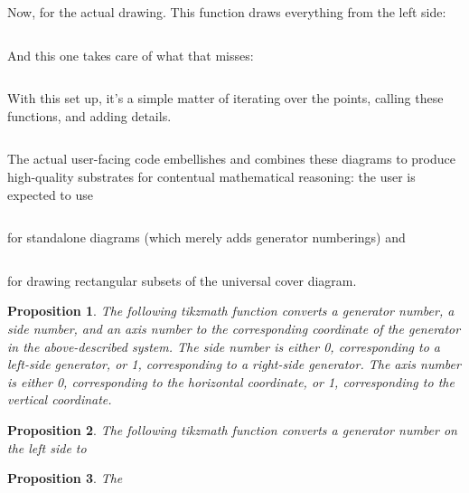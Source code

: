 \documentclass{article}
\newtheorem{prop}{Proposition}
\begin{document}
Now, for the actual drawing.
This function draws everything from the left side:
\inputminted[firstline=75, lastline=103]{tex}{../draw/draw.tex}

And this one takes care of what that misses:
\inputminted[firstline=104, lastline=140]{tex}{../draw/draw.tex}

With this set up, it's a simple matter of iterating over the points, calling these functions,
and adding details.
\inputminted[firstline=141, lastline=149]{tex}{../draw/draw.tex}

The actual user-facing code embellishes and combines these diagrams to produce high-quality substrates
for contentual mathematical reasoning: the user is expected to use
\inputminted[firstline=153, lastline=160]{text}{../draw/draw.tex}
for standalone diagrams (which merely adds generator numberings) and
\inputminted[firstline=162, lastline=180]{tex}{../draw/draw.tex}
for drawing rectangular subsets of the universal cover diagram.


\begin{prop}
  The following tikzmath function converts a generator number, a side number, and an axis number
  to the corresponding coordinate of the generator in the above-described system.
  The side number is either 0, corresponding to a left-side generator, or 1,
  corresponding to a right-side generator.
  The axis number is either 0, corresponding to the horizontal coordinate, or 1,
  corresponding to the vertical coordinate.
\end{prop}

\begin{prop}
  The following tikzmath function converts a generator number on the left side to
\end{prop}

\begin{prop}
  The
\end{prop}
\end{document}
